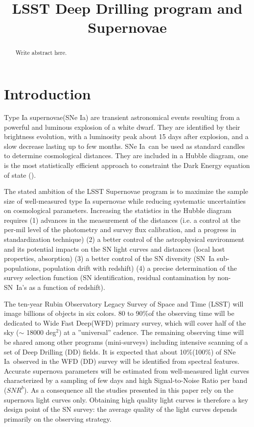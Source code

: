 \documentclass[\docopts]{\docclass}
\newcommand{\snrb}{\mbox{$SNR^b$}}
\newcommand{\sne}{{SNe Ia}}
\newcommand{\degsq}{{deg$^2$}}
\newcommand{\per}{$\%$}
\begin{document}
\title{LSST Deep Drilling program and Supernovae}

\maketitlepre

\begin{abstract}

  Write abstract here.

\end{abstract}

\dockeys{}

\maketitlepost


\section{Introduction}
\label{sec:intro}
Type Ia supernovae(\sne) are transient astronomical events resulting from a powerful and luminous explosion of a white dwarf. They are identified by their brightness evolution, with a luminosity peak about 15 days after explosion, and a slow decrease lasting up to few months. \sne~can be used as standard candles to determine cosmological distances. They are included in a Hubble diagram, one is the most statistically efficient approach to constraint the Dark Energy equation of state (\citealt{Betoule_2014,Scolnic_2018}).
\par
The stated ambition of the LSST Supernovae program is to maximize the sample size of well-measured type Ia supernovae while reducing systematic uncertainties on cosmological parameters. Increasing the statistics in the Hubble diagram requires (1) advances in the measurement of the distances (i.e.  a control at the per-mil level of the photometry and survey flux calibration, and a progress in standardization technique) (2) a better control of the astrophysical environment and its potential impacts on the SN light curves and distances (local host properties, absorption) (3) a better control of the SN diversity (SN~Ia sub-populations, population drift with redshift) (4) a precise determination of the survey selection function (SN identification, residual contamination by non-SN~Ia's as a function of redshift).
\par
 The ten-year Rubin Observatory Legacy Survey of Space and Time (LSST) will image billions of objects in six colors. 80 to 90\per of the observing time will be dedicated to Wide Fast Deep(WFD) primary survey, which will cover half of the sky ($\sim$ 18000 \degsq) at a ''universal'' cadence. The remaining observing time will be shared among other programs (mini-surveys) including intensive scanning of a set of Deep Drilling (DD) fields. It is expected that about 10\per (100\per) of \sne~observed in the WFD (DD) survey will be identified from spectral features. Accurate supernova parameters will be estimated from well-measured light curves characterized by a sampling of few days and high Signal-to-Noise Ratio per band (\snrb).  As a consequence all the studies presented in this paper rely on the supernova light curves only.  Obtaining high quality light curves is therefore a key design point of the SN survey:  the average quality of the light curves depends primarily on the observing strategy.
\end{document}
